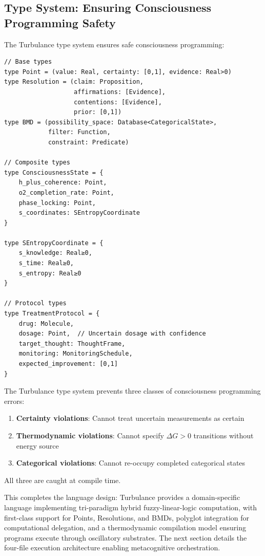 \subsection{Type System: Ensuring Consciousness Programming Safety}

\begin{definition}
The Turbulance type system ensures safe consciousness programming:

\begin{verbatim}
// Base types
type Point = (value: Real, certainty: [0,1], evidence: Real>0)
type Resolution = (claim: Proposition,
                   affirmations: [Evidence],
                   contentions: [Evidence],
                   prior: [0,1])
type BMD = (possibility_space: Database<CategoricalState>,
            filter: Function,
            constraint: Predicate)

// Composite types
type ConsciousnessState = {
    h_plus_coherence: Point,
    o2_completion_rate: Point,
    phase_locking: Point,
    s_coordinates: SEntropyCoordinate
}

type SEntropyCoordinate = {
    s_knowledge: Real≥0,
    s_time: Real≥0,
    s_entropy: Real≥0
}

// Protocol types
type TreatmentProtocol = {
    drug: Molecule,
    dosage: Point,  // Uncertain dosage with confidence
    target_thought: ThoughtFrame,
    monitoring: MonitoringSchedule,
    expected_improvement: [0,1]
}
\end{verbatim}
\end{definition}

\begin{theorem}
\label{thm:type_safety}
The Turbulance type system prevents three classes of consciousness programming errors:

\begin{enumerate}
\item \textbf{Certainty violations}: Cannot treat uncertain measurements as certain
\item \textbf{Thermodynamic violations}: Cannot specify $\Delta G > 0$ transitions without energy source
\item \textbf{Categorical violations}: Cannot re-occupy completed categorical states
\end{enumerate}

All three are caught at compile time.
\end{theorem}

This completes the language design: Turbulance provides a domain-specific language implementing tri-paradigm hybrid fuzzy-linear-logic computation, with first-class support for Points, Resolutions, and BMDs, polyglot integration for computational delegation, and a thermodynamic compilation model ensuring programs execute through oscillatory substrates. The next section details the four-file execution architecture enabling metacognitive orchestration.

